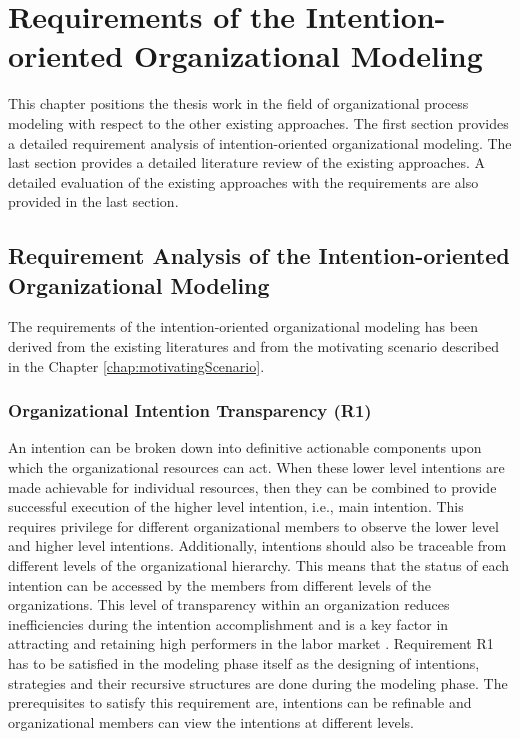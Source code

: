 \chapter{Requirements of the Intention-oriented Organizational Modeling}
\label{chap:analysis}
This chapter positions the thesis work in the field of organizational process modeling with respect to the other existing approaches. The first section provides a detailed requirement analysis of intention-oriented organizational modeling. The last section provides a detailed literature review of the existing approaches. A detailed evaluation of the existing approaches with the requirements are also provided in the last section.

\section{Requirement Analysis of the Intention-oriented Organizational Modeling}
\label{sec:requirementssupoorting}
The requirements of the intention-oriented organizational modeling has been derived from the existing literatures \cite{McManus2007, Mandic2010,Bleistein2006, Lacom, Brambilla2012} and from the motivating scenario described in the Chapter \ref{chap:motivatingScenario}. 

\subsection{Organizational Intention Transparency (R1)}
An intention can be broken down into definitive actionable components upon which the organizational resources can act. When these lower level intentions are made achievable for individual resources, then they can be combined to provide successful execution of the higher level intention, i.e., main intention. This requires privilege for different organizational members to observe the lower level and higher level intentions. Additionally, intentions should also be traceable from different levels of the organizational hierarchy. This means that the status of each intention can be accessed by the members from different levels of the organizations. This level of transparency within an organization reduces inefficiencies during the intention accomplishment and is a key factor in attracting and retaining high performers in the labor market \cite{McManus2007}. Requirement R1 has to be satisfied in the modeling phase itself as the designing of intentions, strategies and their recursive structures are done during the modeling phase. The prerequisites to satisfy this requirement are, intentions can be refinable and organizational members can view the intentions at different levels. 

